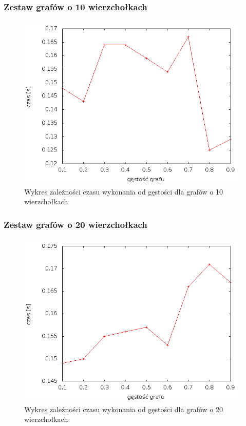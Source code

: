 \documentclass[12pt, a4paper]{article}
\begin{document}
\subsubsection*{Zestaw grafów o 10 wierzchołkach}
\begin{figure}[!h]
    \begin{center}
	\includegraphics[scale=0.5]{results/img/dim/dim_10.png}
	\caption{Wykres zależności czasu wykonania od gęstości dla grafów o 10 wierzchołkach}
    \end{center}
\end{figure}
\FloatBarrier
\subsubsection*{Zestaw grafów o 20 wierzchołkach}
\begin{figure}[!h]
    \begin{center}
	\includegraphics[scale=0.5]{results///img/dim/dim_20.png}
	\caption{Wykres zależności czasu wykonania od gęstości dla grafów o 20 wierzchołkach}
    \end{center}
\end{figure}
\FloatBarrier
\newpage
\end{document}
